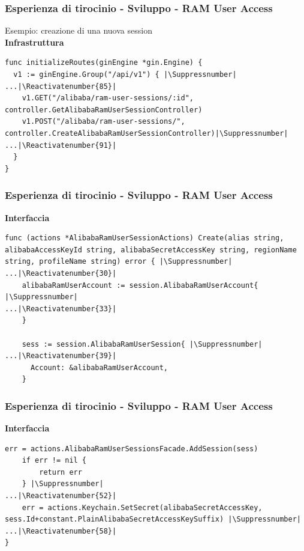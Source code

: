 \documentclass{beamer}
\makeatletter
\let\origthelstnumber\thelstnumber
\newcommand*\Suppressnumber{%
  \lst@AddToHook{OnNewLine}{%
    \let\thelstnumber\relax%
     \advance\c@lstnumber-\@ne\relax%
    }%
}
\newcommand*\Reactivatenumber[1]{%
  \setcounter{lstnumber}{\numexpr#1-1\relax}
  \lst@AddToHook{OnNewLine}{%
   \let\thelstnumber\origthelstnumber%
   \refstepcounter{lstnumber}
  }%
}
\makeatother
\begin{document}
\begin{frame}[fragile]
 \frametitle{Esperienza di tirocinio - Sviluppo - RAM User Access}
 \centering
 Esempio: creazione di una nuova session\\
 \textbf{Infrastruttura}\\
 \begin{lstlisting}[style=customgo, caption=engine.go (righe 53-92), captionpos=b, firstnumber=53]
func initializeRoutes(ginEngine *gin.Engine) {
  v1 := ginEngine.Group("/api/v1") { |\Suppressnumber|
...|\Reactivatenumber{85}|
    v1.GET("/alibaba/ram-user-sessions/:id", controller.GetAlibabaRamUserSessionController)
    v1.POST("/alibaba/ram-user-sessions/", controller.CreateAlibabaRamUserSessionController)|\Suppressnumber|
...|\Reactivatenumber{91}|
  }
}
 \end{lstlisting}
\end{frame}

\begin{frame}[fragile]
 \frametitle{Esperienza di tirocinio - Sviluppo - RAM User Access}
 \centering
 \textbf{Interfaccia}\\
 \begin{lstlisting}[style=customgo, caption=alibaba\_ram\_user\_session\_actions.go (righe 18-40), captionpos=b, firstnumber=18]
func (actions *AlibabaRamUserSessionActions) Create(alias string, alibabaAccessKeyId string, alibabaSecretAccessKey string, regionName string, profileName string) error { |\Suppressnumber|
...|\Reactivatenumber{30}|
	alibabaRamUserAccount := session.AlibabaRamUserAccount{ |\Suppressnumber|
...|\Reactivatenumber{33}|
	}

	sess := session.AlibabaRamUserSession{ |\Suppressnumber|
...|\Reactivatenumber{39}|
      Account: &alibabaRamUserAccount,
	}
 \end{lstlisting}
\end{frame}

\begin{frame}[fragile]
 \frametitle{Esperienza di tirocinio - Sviluppo - RAM User Access}
 \centering
 \textbf{Interfaccia}\\
 \begin{lstlisting}[style=customgo, caption=alibaba\_ram\_user\_session\_actions.go (righe 42-58), captionpos=b, firstnumber=42]
	err = actions.AlibabaRamUserSessionsFacade.AddSession(sess)
	if err != nil {
		return err
	} |\Suppressnumber|
...|\Reactivatenumber{52}|
	err = actions.Keychain.SetSecret(alibabaSecretAccessKey, sess.Id+constant.PlainAlibabaSecretAccessKeySuffix) |\Suppressnumber|
...|\Reactivatenumber{58}|
}
 \end{lstlisting}
\end{frame}
\end{document}
